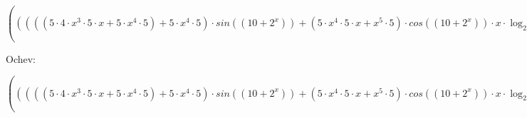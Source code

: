 \documentclass[12pt]{article}
\begin{document}
\begin{center}
$ (((((5 \cdot 4 \cdot {x}^{3} \cdot 5 \cdot x + 5 \cdot {x}^{4} \cdot 5) + 5 \cdot {x}^{4} \cdot 5) \cdot sin\left((10 + {2}^{x})\right) + (5 \cdot {x}^{4} \cdot 5 \cdot x + {x}^{5} \cdot 5) \cdot cos\left((10 + {2}^{x})\right) \cdot x \cdot \log_{2.71828} \left(2\right)) + ((5 \cdot {x}^{4} \cdot 5 \cdot x + {x}^{5} \cdot 5) \cdot cos\left((10 + {2}^{x})\right) \cdot x \cdot \log_{2.71828} \left(2\right) + {x}^{5} \cdot 5 \cdot x \cdot (-1 \cdot sin\left((10 + {2}^{x})\right) \cdot x \cdot \log_{2.71828} \left(2\right) \cdot x \cdot \log_{2.71828} \left(2\right) + cos\left((10 + {2}^{x})\right) \cdot \log_{2.71828} \left(2\right)))) + \frac{((0 - \frac{(0 - \log_{2.71828} \left(3\right))}{x \cdot \log_{2.71828} \left(3\right) \cdot x \cdot \log_{2.71828} \left(3\right)}) \cdot \log_{3} \left(x\right) \cdot \log_{3} \left(x\right) - (0 - \frac{1}{x \cdot \log_{2.71828} \left(3\right)}) \cdot (\frac{1}{x \cdot \log_{2.71828} \left(3\right)} \cdot \log_{3} \left(x\right) + \log_{3} \left(x\right) \cdot \frac{1}{x \cdot \log_{2.71828} \left(3\right)}))}{\log_{3} \left(x\right) \cdot \log_{3} \left(x\right) \cdot \log_{3} \left(x\right) \cdot \log_{3} \left(x\right)}) $
\end{center}
Ochev: 
\begin{center}
$ (((((5 \cdot 4 \cdot {x}^{3} \cdot 5 \cdot x + 5 \cdot {x}^{4} \cdot 5) + 5 \cdot {x}^{4} \cdot 5) \cdot sin\left((10 + {2}^{x})\right) + (5 \cdot {x}^{4} \cdot 5 \cdot x + {x}^{5} \cdot 5) \cdot cos\left((10 + {2}^{x})\right) \cdot x \cdot \log_{2.71828} \left(2\right)) + ((5 \cdot {x}^{4} \cdot 5 \cdot x + {x}^{5} \cdot 5) \cdot cos\left((10 + {2}^{x})\right) \cdot x \cdot \log_{2.71828} \left(2\right) + {x}^{5} \cdot 5 \cdot x \cdot (-1 \cdot sin\left((10 + {2}^{x})\right) \cdot x \cdot \log_{2.71828} \left(2\right) \cdot x \cdot \log_{2.71828} \left(2\right) + cos\left((10 + {2}^{x})\right) \cdot \log_{2.71828} \left(2\right)))) + \frac{((0 - \frac{(0 - \log_{2.71828} \left(3\right))}{x \cdot \log_{2.71828} \left(3\right) \cdot x \cdot \log_{2.71828} \left(3\right)}) \cdot \log_{3} \left(x\right) \cdot \log_{3} \left(x\right) - (0 - \frac{1}{x \cdot \log_{2.71828} \left(3\right)}) \cdot (\frac{1}{x \cdot \log_{2.71828} \left(3\right)} \cdot \log_{3} \left(x\right) + \log_{3} \left(x\right) \cdot \frac{1}{x \cdot \log_{2.71828} \left(3\right)}))}{\log_{3} \left(x\right) \cdot \log_{3} \left(x\right) \cdot \log_{3} \left(x\right) \cdot \log_{3} \left(x\right)}) $
\end{center}
\end{document}

